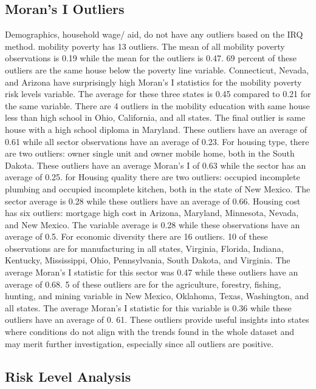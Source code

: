 \subsection{Moran's I Outliers}
Demographics, household wage/ aid, do not have any outliers based on the IRQ method.  mobility poverty has 13 outliers. The mean of all mobility poverty observations is 0.19 while the mean for the outliers is 0.47. 69 percent of these outliers are the same house below the poverty line variable. Connecticut, Nevada, and Arizona have surprisingly high Moran’s I statistics for the mobility poverty risk levels variable. The average for these three states is 0.45 compared to 0.21 for the same variable. There are 4 outliers in the mobility education  with same house less than high school in Ohio, California, and all states. The final outlier is same house with a high school diploma in Maryland. These outliers have an average of 0.61 while all sector observations have an average of 0.23. For housing type, there are two outliers: owner single unit and owner mobile home, both in the South Dakota. These outliers have an average Moran’s I of 0.63 while the sector has an average of 0.25. for Housing quality there are two outliers: occupied incomplete plumbing and occupied incomplete kitchen, both in the state of New Mexico. The sector average is 0.28 while these outliers have an average of 0.66. Housing cost has six outliers: mortgage high cost in Arizona, Maryland, Minnesota, Nevada, and New Mexico. The variable average is 0.28 while these observations have an average of 0.5. For economic diversity there are 16 outliers. 10 of these observations are for manufacturing in all states, Virginia, Florida, Indiana, Kentucky, Mississippi, Ohio, Pennsylvania, South Dakota, and Virginia. The average Moran’s I statistic for this sector was 0.47 while these outliers have an average of 0.68. 5 of these outliers are for the agriculture, forestry, fishing, hunting, and mining variable in New Mexico, Oklahoma, Texas, Washington, and all states. The average Moran’s I statistic for this variable is 0.36 while these outliers have an average of 0. 61. These outliers provide useful insights into states where conditions do not align with the trends found in the whole dataset and may merit further investigation, especially since all outliers are positive.  

\subsection{Risk Level Analysis}

